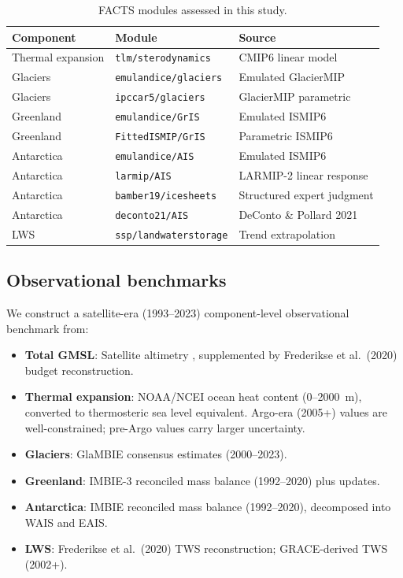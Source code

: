 \documentclass[11pt]{article}
\begin{document}
\begin{table}[ht]
\centering
\caption{FACTS modules assessed in this study.}
\label{tab:modules}
\begin{tabular}{lll}
\toprule
Component & Module & Source \\
\midrule
Thermal expansion & \texttt{tlm/sterodynamics} & CMIP6 linear model \\
Glaciers & \texttt{emulandice/glaciers} & Emulated GlacierMIP \\
Glaciers & \texttt{ipccar5/glaciers} & GlacierMIP parametric \\
Greenland & \texttt{emulandice/GrIS} & Emulated ISMIP6 \\
Greenland & \texttt{FittedISMIP/GrIS} & Parametric ISMIP6 \\
Antarctica & \texttt{emulandice/AIS} & Emulated ISMIP6 \\
Antarctica & \texttt{larmip/AIS} & LARMIP-2 linear response \\
Antarctica & \texttt{bamber19/icesheets} & Structured expert judgment \\
Antarctica & \texttt{deconto21/AIS} & DeConto \& Pollard 2021 \\
LWS & \texttt{ssp/landwaterstorage} & Trend extrapolation \\
\bottomrule
\end{tabular}
\end{table}

\subsection{Observational benchmarks}

We construct a satellite-era (1993--2023) component-level observational benchmark from:
\begin{itemize}
  \item \textbf{Total GMSL}: Satellite altimetry \citep{nerem2018climate}, supplemented by Frederikse et al.\ (2020) budget reconstruction.
  \item \textbf{Thermal expansion}: NOAA/NCEI ocean heat content (0--2000~m), converted to thermosteric sea level equivalent.  Argo-era (2005+) values are well-constrained; pre-Argo values carry larger uncertainty.
  \item \textbf{Glaciers}: GlaMBIE consensus estimates (2000--2023).
  \item \textbf{Greenland}: IMBIE-3 reconciled mass balance (1992--2020) plus updates.
  \item \textbf{Antarctica}: IMBIE reconciled mass balance (1992--2020), decomposed into WAIS and EAIS.
  \item \textbf{LWS}: Frederikse et al.\ (2020) TWS reconstruction; GRACE-derived TWS (2002+).
\end{itemize}
\end{document}
